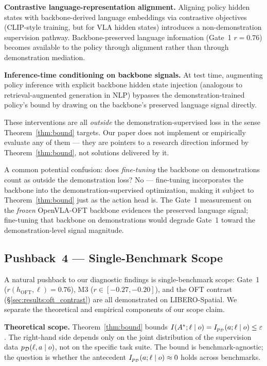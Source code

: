 \textbf{Contrastive language-representation alignment.} Aligning policy hidden states
with backbone-derived language embeddings via contrastive objectives (CLIP-style
training, but for VLA hidden states) introduces a non-demonstration supervision pathway.
Backbone-preserved language information (Gate~1 $r = 0.76$) becomes available to the
policy through alignment rather than through demonstration mediation.

\textbf{Inference-time conditioning on backbone signals.} At test time, augmenting policy
inference with explicit backbone hidden state injection (analogous to retrieval-augmented
generation in NLP) bypasses the demonstration-trained policy's bound by drawing on the
backbone's preserved language signal directly.

These interventions are all \emph{outside} the demonstration-supervised loss in the sense
Theorem~\ref{thm:bound} targets. Our paper does not implement or empirically evaluate any
of them --- they are pointers to a research direction informed by
Theorem~\ref{thm:bound}, not solutions delivered by it.

A common potential confusion: does \emph{fine-tuning} the backbone on demonstrations
count as outside the demonstration loss? No --- fine-tuning incorporates the backbone
into the demonstration-supervised optimization, making it subject to
Theorem~\ref{thm:bound} just as the action head is. The Gate~1 measurement on the
\emph{frozen} OpenVLA-OFT backbone evidences the preserved language signal; fine-tuning
that backbone on demonstrations would degrade Gate~1 toward the demonstration-level
signal magnitude.

\subsection{Pushback~4 --- Single-Benchmark Scope}
\label{sec:discussion:single_benchmark}

A natural pushback to our diagnostic findings is single-benchmark scope: Gate~1
($r(h_{\mathrm{OFT}}, \ell) = 0.76$), M3 ($r \in [-0.27, -0.20]$), and the OFT contrast
(\S\ref{sec:results:oft_contrast}) are all demonstrated on LIBERO-Spatial. We separate
the theoretical and empirical components of our scope claim.

\textbf{Theoretical scope.} Theorem~\ref{thm:bound} bounds $I(A^{*}; \ell \mid o) =
I_{p_{\mathcal{D}}}(a; \ell \mid o) \le \varepsilon$. The right-hand side depends only on the joint
distribution of the supervision data $p_{\mathcal{D}}(\ell, a \mid o)$, not on the specific task
suite. The bound is benchmark-agnostic; the question is whether the antecedent
$I_{p_{\mathcal{D}}}(a; \ell \mid o) \approx 0$ holds across benchmarks.

